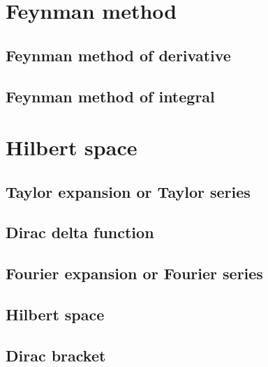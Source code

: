 \documentclass[
]{book}
\theoremstyle{definition}
\theoremstyle{definition}
\theoremstyle{definition}
\theoremstyle{definition}
\theoremstyle{remark}
\begin{document}
\hypertarget{feynman-method}{%
\chapter{Feynman method}\label{feynman-method}}

\hypertarget{feynman-method-of-derivative}{%
\section{Feynman method of derivative}\label{feynman-method-of-derivative}}

\hypertarget{feynman-method-of-integral}{%
\section{Feynman method of integral}\label{feynman-method-of-integral}}

\hypertarget{hilbert-space}{%
\chapter{Hilbert space}\label{hilbert-space}}

\hypertarget{taylor-expansion-or-taylor-series}{%
\section{Taylor expansion or Taylor series}\label{taylor-expansion-or-taylor-series}}

\hypertarget{dirac-delta-function}{%
\section{Dirac delta function}\label{dirac-delta-function}}

\hypertarget{fourier-expansion-or-fourier-series}{%
\section{Fourier expansion or Fourier series}\label{fourier-expansion-or-fourier-series}}

\hypertarget{hilbert-space-1}{%
\section{Hilbert space}\label{hilbert-space-1}}

\hypertarget{dirac-bracket}{%
\section{Dirac bracket}\label{dirac-bracket}}
\end{document}
